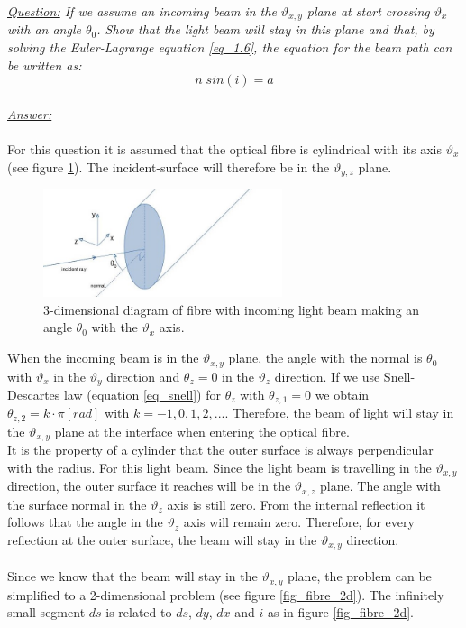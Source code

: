 \documentclass{article}
\begin{document}
\subsubsection{}

\textit{\underline{Question:} If we assume an incoming beam in the $\vartheta _{x,y}$ plane at start crossing $\vartheta _x$ with an angle $\theta _0$. Show that the light beam will stay in this plane and that, by solving the Euler-Lagrange equation \ref{eq_1.6}, the equation for the beam path can be written as:}\\
\begin{equation}
	n \; sin(i) = a
	\label{eq_2.1}
\end{equation}
\\
\textit{\underline{Answer:}} \\
\\

For this question it is assumed that the optical fibre is cylindrical with its axis $\vartheta _x$ (see figure \ref{fig_fibre_3d}). The incident-surface will therefore be in the $\vartheta _{y,z}$ plane.\\

\begin{figure}[h!]
	\centering
	\includegraphics[width=7cm]{afbeeldingen/fibre_3d.jpg}
	\caption{3-dimensional diagram of fibre with incoming light beam making an angle $\theta _0$ with the $\vartheta _x$ axis.}
	\label{fig_fibre_3d}
\end{figure}
When the incoming beam is in the $\vartheta _{x,y}$ plane, the angle with the normal is $\theta _0$ with $\vartheta _x$ in the $\vartheta _y$ direction and $\theta _z = 0$ in the $\vartheta _z$ direction. If we use Snell-Descartes law (equation \ref{eq_snell}) for $\theta _z$ with $\theta _{z,1} = 0$ we obtain $\theta _{z,2} = k \cdot \pi [rad]$ with $k = -1,0,1,2,...$. Therefore, the beam of light will stay in the $\vartheta _{x,y}$ plane at the interface when entering the optical fibre. \\
It is the property of a cylinder that the outer surface is always perpendicular with the radius. For this light beam. Since the light beam is travelling in the $\vartheta _{x,y}$ direction, the outer surface it reaches will be in the $\vartheta _{x,z}$ plane. The angle with the surface normal in the $\vartheta _z$ axis is still zero. From the internal reflection it follows that the angle in  the $\vartheta _z$ axis will remain zero. Therefore, for every reflection at the outer surface, the beam will stay in the $\vartheta _{x,y}$ direction.\\
\\
Since we know that the beam will stay in the $\vartheta _{x,y}$ plane, the problem can  be simplified to a 2-dimensional problem (see figure \ref{fig_fibre_2d}). The infinitely small segment $ds$ is related to $ds$, $dy$, $dx$ and $i$ as in figure \ref{fig_fibre_2d}.
\end{document}
